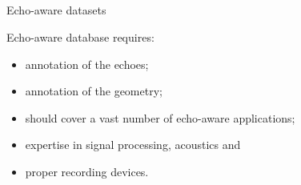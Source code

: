 \subsection{\dechorate}

\begin{frame}{Echo-aware datasets  \hfill\faBook}


    \vspace{1mm}
    \begin{block}{Echo-aware database requires:}
        \begin{itemize}
            \item annotation of the echoes;
            \item annotation of the geometry;
            \item should cover a vast number of echo-aware applications;
            \item expertise in signal processing, acoustics and
            \item proper recording devices.
        \end{itemize}
    \end{block}

\end{frame}

